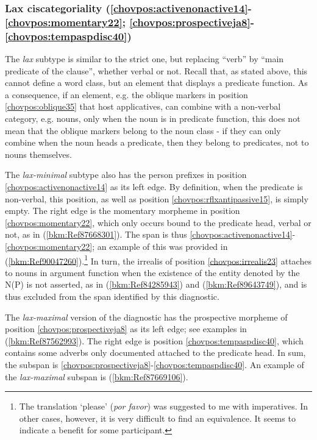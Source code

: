 \documentclass[output=paper]{langscibook}
\begin{document}
\subsubsection{Lax ciscategoriality (\ref{chovpos:activenonactive14}{}-\ref{chovpos:momentary22}; \ref{chovpos:prospectiveja8}{}-\ref{chovpos:tempaspdisc40})}

The \textit{lax} subtype is similar to the strict one, but replacing ``verb'' by ``main predicate of the clause'', whether verbal or not. Recall that, as stated above, this cannot define a word class, but an element that displays a predicate function. As a consequence, if an element, e.g. the oblique markers in position \ref{chovpos:oblique35} that host applicatives, can combine with a non-verbal category, e.g. nouns, only when the noun is in predicate function, this does not mean that the oblique markers belong to the noun class - if they can only combine when the noun heads a predicate, then they belong to predicates, not to nouns themselves.

The \textit{lax-minimal} subtype also has the person prefixes in position \ref{chovpos:activenonactive14} as its left edge. By definition, when the predicate is non-verbal, this position, as well as position \ref{chovpos:rflxantipassive15}, is simply empty. The right edge is the momentary morpheme in position \ref{chovpos:momentary22}, which only occurs bound to the predicate head, verbal or not, as in (\ref{bkm:Ref87668301}). The span is thus \ref{chovpos:activenonactive14}{}-\ref{chovpos:momentary22}; an example of this was provided in (\ref{bkm:Ref90047260}).\footnote{The translation `please' (\textit{por favor}) was suggested to me with imperatives. In other cases, however, it is very difficult to find an equivalence. It seems to indicate a benefit for some participant.} In turn, the irrealis of position \ref{chovpos:irrealis23} attaches to nouns in argument function when the existence of the entity denoted by the N(P) is not asserted, as in (\ref{bkm:Ref84285943}) and (\ref{bkm:Ref89643749}), and is thus excluded from the span identified by this diagnostic. 

The \textit{lax-maximal} version of the diagnostic has the prospective morpheme of position \ref{chovpos:prospectiveja8} as its left edge; see examples in (\ref{bkm:Ref87562993}). The right edge is position \ref{chovpos:tempaspdisc40}, which contains some adverbs only documented attached to the predicate head. In sum, the subspan is \ref{chovpos:prospectiveja8}{}-\ref{chovpos:tempaspdisc40}. An example of the \textit{lax-maximal} subspan is (\ref{bkm:Ref87669106}).
\end{document}
